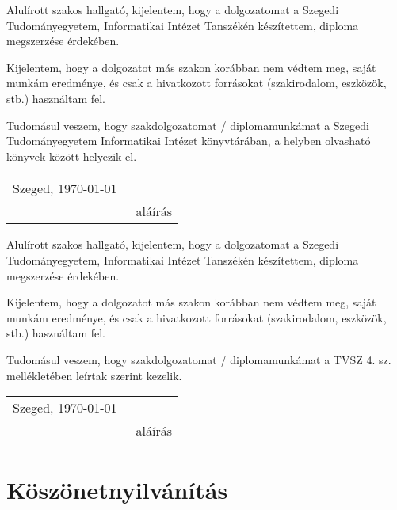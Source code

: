 \documentclass[12pt]{report}
\theoremstyle{definition}
\begin{document}
\noindent
Alulírott \makebox[4cm]{\dotfill} szakos hallgató, kijelentem, hogy a dolgozatomat a Szegedi Tudományegyetem, Informatikai Intézet \makebox[4cm]{\dotfill} Tanszékén készítettem, \makebox[4cm]{\dotfill} diploma megszerzése érdekében.

Kijelentem, hogy a dolgozatot más szakon korábban nem védtem meg, saját munkám eredménye, és csak a hivatkozott forrásokat (szakirodalom, eszközök, stb.) használtam fel.

Tudomásul veszem, hogy szakdolgozatomat / diplomamunkámat a Szegedi Tudományegyetem Informatikai Intézet könyvtárában, a helyben olvasható könyvek között helyezik el.

\vspace*{2cm}

\begin{tabular}{lc}
	Szeged, \today\
	\hspace{2cm} & \makebox[6cm]{\dotfill} \\
	             & aláírás                 \\
\end{tabular}


\vspace*{4cm}


\noindent
Alulírott \makebox[4cm]{\dotfill} szakos hallgató, kijelentem, hogy a dolgozatomat a Szegedi Tudományegyetem, Informatikai Intézet \makebox[4cm]{\dotfill} Tanszékén készítettem, \makebox[4cm]{\dotfill} diploma megszerzése érdekében.

Kijelentem, hogy a dolgozatot más szakon korábban nem védtem meg, saját munkám eredménye, és csak a hivatkozott forrásokat (szakirodalom, eszközök, stb.) használtam fel.

Tudomásul veszem, hogy szakdolgozatomat / diplomamunkámat a TVSZ 4. sz. mellékletében leírtak szerint kezelik.

\vspace*{2cm}

\begin{tabular}{lc}
	Szeged, \today\
	\hspace{2cm} & \makebox[6cm]{\dotfill} \\
	             & aláírás                 \\
\end{tabular}





\chapter*{Köszönetnyilvánítás}
\end{document}
